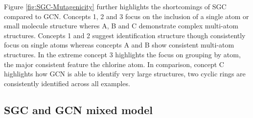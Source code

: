 Figure \ref{fig:SGC-Mutagenicity} further highlights the shortcomings of SGC compared to GCN.
Concepts 1, 2 and 3 focus on the inclusion of a single atom or small molecule structure wheres A, B and C demonstrate complex multi-atom structures.
Concepts 1 and 2 suggest identification structure though consistently focus on single atoms whereas concepts A and B show consistent multi-atom structures.
In the extreme concept 3 highlights the focus on grouping by atom, the major consistent feature the chlorine atom.
In comparison, concept C highlights how GCN is able to identify very large structures, two cyclic rings are consistently identified across all examples.

\subsection{SGC and GCN mixed model}
\label{sec:SGCN}

